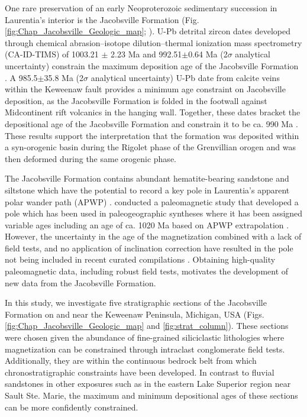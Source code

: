 One rare preservation of an early Neoproterozoic sedimentary succession in Laurentia's interior is the Jacobsville Formation (Fig. \ref{fig:Chap_Jacobsville_Geologic_map}; \cite{Hamblin1958a, Hodgin2022a, DeGraff2022a}). U-Pb detrital zircon dates developed through chemical abrasion–isotope dilution–thermal ionization mass spectrometry (CA-ID-TIMS) of 1003.21 $\pm$ 2.23 Ma and 992.51$\pm$0.64 Ma (2$\sigma$ analytical uncertainty) constrain the maximum deposition age of the Jacobsville Formation \citep{Hodgin2022a}. A 985.5$\pm$35.8 Ma (2$\sigma$ analytical uncertainty) U-Pb date from calcite veins within the Keweenaw fault provides a minimum age constraint on Jacobsville deposition, as the Jacobsville Formation is folded in the footwall against Midcontinent rift volcanics in the hanging wall. Together, these dates bracket the depositional age of the Jacobsville Formation and constrain it to be ca. 990 Ma \citep{Hodgin2022a}. These results support the interpretation that the formation was deposited within a syn-orogenic basin during the Rigolet phase of the Grenvillian orogen and was then deformed during the same orogenic phase.

The Jacobsville Formation contains abundant hematite-bearing sandstone and siltstone which have the potential to record a key pole in Laurentia's apparent polar wander path (APWP) \citep{Dubois1962a, Roy1978a}. \cite{Roy1978a} conducted a paleomagnetic study that developed a pole which has been used in paleogeographic syntheses where it has been assigned variable ages including an age of ca. 1020 Ma based on APWP extrapolation \cite[e.g.][]{Li2008a}. However, the uncertainty in the age of the magnetization combined with a lack of field tests, and no application of inclination correction have resulted in the pole not being included in recent curated compilations \cite[e.g.][]{Evans2021a}. Obtaining high-quality paleomagnetic data, including robust field tests, motivates the development of new data from the Jacobsville Formation. 

In this study, we investigate five stratigraphic sections of the Jacobsville Formation on and near the Keweenaw Peninsula, Michigan, USA (Figs. \ref{fig:Chap_Jacobsville_Geologic_map} and \ref{fig:strat_column}). These sections were chosen given the abundance of fine-grained siliciclastic lithologies where magnetization can be constrained through intraclast conglomerate field tests. Additionally, they are within the continuous bedrock belt from which chronostratigraphic constraints have been developed. In contrast to fluvial sandstones in other exposures such as in the eastern Lake Superior region near Sault Ste. Marie, the maximum and minimum depositional ages of these sections can be more confidently constrained. 

